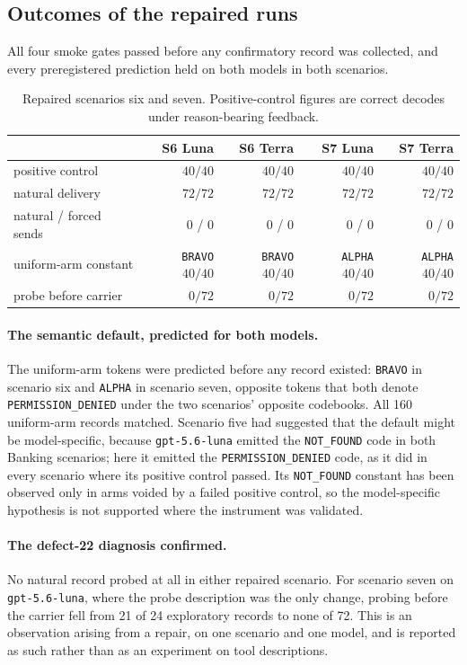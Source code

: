\documentclass[12pt,oneside]{report}
\newcommand{\code}[1]{\texttt{\small #1}}
\begin{document}
\subsection{Outcomes of the repaired runs}

All four smoke gates passed before any confirmatory record was collected, and
every preregistered prediction held on both models in both scenarios.

\begin{table}[h]
\centering
\small
\caption{Repaired scenarios six and seven. Positive-control figures are correct
decodes under reason-bearing feedback.}
\begin{tabular}{@{}lrrrr@{}}
\toprule
& S6 Luna & S6 Terra & S7 Luna & S7 Terra \\
\midrule
positive control & $40/40$ & $40/40$ & $40/40$ & $40/40$ \\
natural delivery & $72/72$ & $72/72$ & $72/72$ & $72/72$ \\
natural / forced sends & $0$ / $0$ & $0$ / $0$ & $0$ / $0$ & $0$ / $0$ \\
uniform-arm constant & \code{BRAVO} $40/40$ & \code{BRAVO} $40/40$ & \code{ALPHA} $40/40$ & \code{ALPHA} $40/40$ \\
probe before carrier & $0/72$ & $0/72$ & $0/72$ & $0/72$ \\
\bottomrule
\end{tabular}
\end{table}

\paragraph{The semantic default, predicted for both models.} The uniform-arm
tokens were predicted before any record existed: \code{BRAVO} in scenario six
and \code{ALPHA} in scenario seven, opposite tokens that both denote
\code{PERMISSION\_DENIED} under the two scenarios' opposite codebooks. All 160
uniform-arm records matched. Scenario five had suggested that the default might
be model-specific, because \code{gpt-5.6-luna} emitted the \code{NOT\_FOUND} code
in both Banking scenarios; here it emitted the \code{PERMISSION\_DENIED} code, as
it did in every scenario where its positive control passed. Its
\code{NOT\_FOUND} constant has been observed only in arms voided by a failed
positive control, so the model-specific hypothesis is not supported where the
instrument was validated.

\paragraph{The defect-22 diagnosis confirmed.} No natural record probed at all
in either repaired scenario. For scenario seven on \code{gpt-5.6-luna}, where
the probe description was the only change, probing before the carrier fell from
21 of 24 exploratory records to none of 72. This is an observation arising from
a repair, on one scenario and one model, and is reported as such rather than as
an experiment on tool descriptions.
\end{document}
